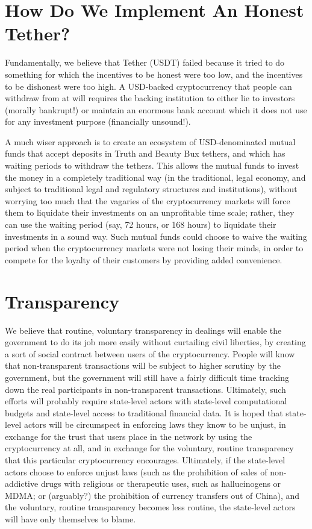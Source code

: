 \documentclass{article}
\begin{document}
\section{How Do We Implement An Honest Tether?}

Fundamentally, we believe that Tether (USDT) failed because it tried
to do something for which the incentives to be honest were too low,
and the incentives to be dishonest were too high. A USD-backed
cryptocurrency that people can withdraw from at will requires the
backing institution to either lie to investors (morally bankrupt!) or
maintain an enormous bank account which it does not use for any
investment purpose (financially unsound!).

A much wiser approach is to create an ecosystem of USD-denominated
mutual funds that accept deposits in Truth and Beauty Bux tethers, and
which has waiting periods to withdraw the tethers. This allows the
mutual funds to invest the money in a completely traditional way (in
the traditional, legal economy, and subject to traditional legal and
regulatory structures and institutions), without worrying too much
that the vagaries of the cryptocurrency markets will force them to
liquidate their investments on an unprofitable time scale; rather,
they can use the waiting period (say, 72 hours, or 168 hours) to
liquidate their investments in a sound way. Such mutual funds could
choose to waive the waiting period when the cryptocurrency markets
were not losing their minds, in order to compete for the loyalty of
their customers by providing added convenience.

\section{Transparency}

We believe that routine, voluntary transparency in dealings will
enable the government to do its job more easily without curtailing
civil liberties, by creating a sort of social contract between users
of the cryptocurrency. People will know that non-transparent
transactions will be subject to higher scrutiny by the government, but
the government will still have a fairly difficult time tracking down
the real participants in non-transparent transactions. Ultimately,
such efforts will probably require state-level actors with state-level
computational budgets and state-level access to traditional financial
data. It is hoped that state-level actors will be circumspect in
enforcing laws they know to be unjust, in exchange for the trust that
users place in the network by using the cryptocurrency at all, and in
exchange for the voluntary, routine transparency that this particular
cryptocurrency encourages. Ultimately, if the state-level actors
choose to enforce unjust laws (such as the prohibition of sales of
non-addictive drugs with religious or therapeutic uses, such as
hallucinogens or MDMA; or (arguably?) the prohibition of currency
transfers out of China), and the voluntary, routine transparency
becomes less routine, the state-level actors will have only themselves
to blame.
\end{document}
